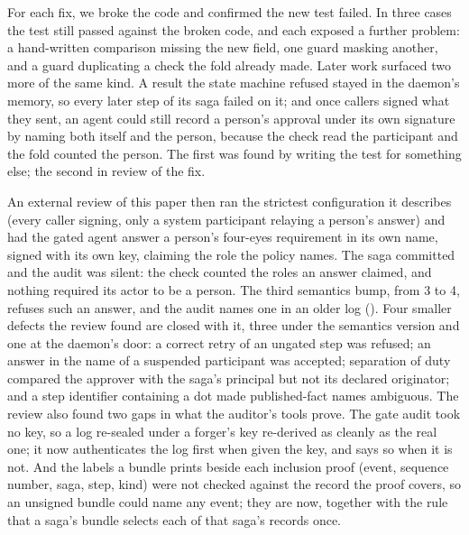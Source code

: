 For each fix, we broke the code and confirmed the new test failed. In three
cases the test still passed against the broken code, and each exposed a further
problem: a hand-written comparison missing the new field, one guard masking
another, and a guard duplicating a check the fold already made.
Later work surfaced two more of the same kind. A result
the state machine refused stayed in the daemon's memory, so every later step of
its saga failed on it; and once callers signed what they sent, an agent could
still record a person's approval under its own signature by naming both itself
and the person, because the check read the participant and the fold counted the
person. The first was found by writing the test for something else; the second
in review of the fix.

An external review of this paper then ran the strictest configuration it
describes (every caller signing, only a system participant relaying a person's
answer) and had the gated agent answer a person's four-eyes requirement in its
own name, signed with its own key, claiming the role the policy names. The saga
committed and the audit was silent: the check counted the roles an answer
claimed, and nothing required its actor to be a person. The third semantics bump, from 3 to 4,
refuses such an answer, and the audit names one in an older log
(). Four smaller defects the review found are closed with
it, three under the semantics version and one at the daemon's door: a correct retry of an ungated step was refused; an answer in the name of a
suspended participant was accepted; separation of duty compared the approver
with the saga's principal but not its declared originator; and a step identifier
containing a dot made published-fact names ambiguous. The review also found two gaps in what the auditor's
tools prove. The gate audit took no key, so a log re-sealed under a forger's key
re-derived as cleanly as the real one; it now authenticates the log first when
given the key, and says so when it is not. And the labels a bundle prints beside
each inclusion proof (event, sequence number, saga, step, kind) were not checked
against the record the proof covers, so an unsigned bundle could name any event;
they are now, together with the rule that a saga's bundle selects each of that
saga's records once.

